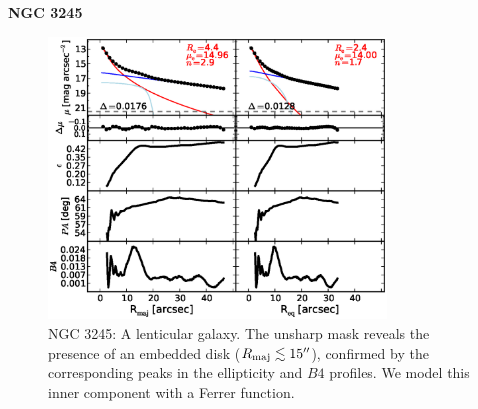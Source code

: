 \documentclass[preprint2]{emulateapj}
\newcommand{\fitfigurewidth}{0.8\textwidth}
\begin{document}
  \clearpage\newpage\noindent
  {\bf NGC 3245 \\}

  \begin{figure}[h]
  \begin{center}
  \includegraphics[width=\fitfigurewidth]{n3245_1Dfit.eps}
  \caption{NGC 3245:
  A lenticular galaxy.
  The unsharp mask reveals the presence of an embedded disk ($R_{\rm maj} \lesssim 15''$), 
  confirmed by the corresponding peaks in the ellipticity and $B4$ profiles.
  We model this inner component with a Ferrer function. 
  }
  \end{center}
  \end{figure}
\end{document}
